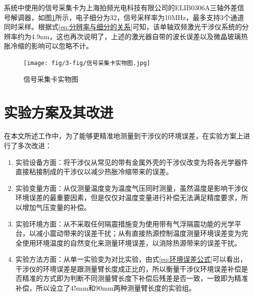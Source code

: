 系统中使用的信号采集卡为上海拍频光电科技有限公司的ELIB0306A三轴外差信号解调器，如图\ref{fig:信号采集卡实物图}所示，电子细分为32，信号采样率为10MHz，最多支持3个通道同时采样\cite{信号处理卡}。根据式\eqref{eq:分辨率与细分的关系}可知，该单轴双频激光干涉仪系统的分辨率约为4.9nm，这也再次说明了，上述的激光器自带的波长误差以及微晶玻璃热胀冷缩的影响可以忽略不计。
\begin{figure}[htb]
    \centering
    \texttt{[image: fig/3-fig/信号采集卡实物图.jpg]}
    \caption{信号采集卡实物图}
    \label{fig:信号采集卡实物图}
\end{figure}

\section{实验方案及其改进}
在本文所述工作中，为了能够更精准地测量到干涉仪的环境误差，在实验方案上进行了多次改进：
\begin{enumerate}
    \item 实验设备方面：将干涉仪从常见的带有金属外壳的干涉仪改变为将各光学器件直接粘接制成的干涉仪以减少热胀冷缩带来的误差。
    \item 实验变量方面：从仅测量温度变为温度气压同时测量，虽然温度是影响干涉仪环境误差的最重要因素，但是仅仅对温度变量进行补偿无法满足精度要求，所以增加气压变量的补偿。
    \item 实验环境方面：从不采取任何隔震措施变为使用带有气浮隔震功能的光学平台，以减小震动带来的误差干扰；从有直接热源控制温度测量环境误差变为完全使用环境温度的自然变化来测量环境误差，以消除热源带来的误差干扰。
    \item 实验方法方面：从单一实验变为对比实验，由式\eqref{eq:环境误差公式}可以看出，干涉仪的环境误差是跟测量臂长度成正比的，所以衡量干涉仪环境误差补偿是否精准的方式即为判断不同测量臂长度下补偿后残差是否一致，一致即为精准补偿，所以设立了45mm和90mm两种测量臂长度的实验组。
  \end{enumerate}
